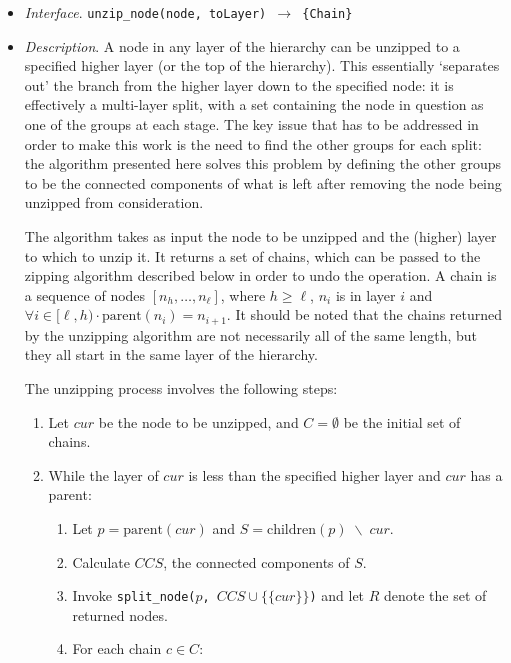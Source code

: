 \begin{itemize}

\item \emph{Interface}. \texttt{unzip_node(node, toLayer) $\rightarrow$ \{Chain\}}

\item \emph{Description}. A node in any layer of the hierarchy can be unzipped to a specified higher layer (or the top of the hierarchy). This essentially `separates out' the branch from the higher layer down to the specified node: it is effectively a multi-layer split, with a set containing the node in question as one of the groups at each stage. The key issue that has to be addressed in order to make this work is the need to find the other groups for each split: the algorithm presented here solves this problem by defining the other groups to be the connected components of what is left after removing the node being unzipped from consideration.

The algorithm takes as input the node to be unzipped and the (higher) layer to which to unzip it. It returns a set of chains, which can be passed to the zipping algorithm described below in order to undo the operation. A chain is a sequence of nodes $[n_h,\ldots,n_\ell]$, where $h \ge \ell$, $n_i$ is in layer $i$ and $\forall i \in [\ell,h) \cdot \mbox{parent}(n_i) = n_{i+1}$. It should be noted that the chains returned by the unzipping algorithm are not necessarily all of the same length, but they all start in the same layer of the hierarchy.

The unzipping process involves the following steps:

\begin{enumerate}

\item Let $cur$ be the node to be unzipped, and $C = \emptyset$ be the initial set of chains.

\item While the layer of $cur$ is less than the specified higher layer and $cur$ has a parent:

\begin{enumerate}

\item Let $p = \mbox{parent}(cur)$ and $S = \mbox{children}(p) \; \backslash \; cur$.
\item Calculate $\textit{CCS}$, the connected components of $S$.
\item Invoke \texttt{split_node($p$, $\textit{CCS} \cup \{\{cur\}\}$)} and let $R$ denote the set of returned nodes.
\item For each chain $c \in C$:


\end{enumerate}
\end{enumerate}
\end{itemize}
